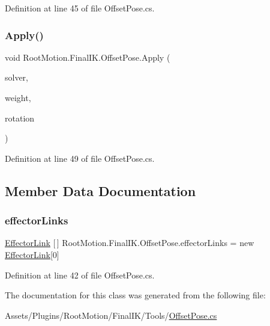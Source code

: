 Definition at line 45 of file Offset\+Pose.\+cs.

\mbox{\label{class_root_motion_1_1_final_i_k_1_1_offset_pose_a07d594579efa5d24c035c9b7f7466c4a}} 
\subsubsection{\texorpdfstring{Apply()}{Apply()}\hspace{0.1cm}{\footnotesize\ttfamily [2/2]}}
{\footnotesize\ttfamily void Root\+Motion.\+Final\+I\+K.\+Offset\+Pose.\+Apply (\begin{DoxyParamCaption}\item[{\mbox{\hyperlink{class_root_motion_1_1_final_i_k_1_1_i_k_solver_full_body_biped}{I\+K\+Solver\+Full\+Body\+Biped}}}]{solver,  }\item[{float}]{weight,  }\item[{Quaternion}]{rotation }\end{DoxyParamCaption})}



Definition at line 49 of file Offset\+Pose.\+cs.



\subsection{Member Data Documentation}
\mbox{\label{class_root_motion_1_1_final_i_k_1_1_offset_pose_a5cf6d676790ad541fda32fec19ce4e40}} 
\subsubsection{\texorpdfstring{effector\+Links}{effectorLinks}}
{\footnotesize\ttfamily \mbox{\hyperlink{class_root_motion_1_1_final_i_k_1_1_offset_pose_1_1_effector_link}{Effector\+Link}} \mbox{[}$\,$\mbox{]} Root\+Motion.\+Final\+I\+K.\+Offset\+Pose.\+effector\+Links = new \mbox{\hyperlink{class_root_motion_1_1_final_i_k_1_1_offset_pose_1_1_effector_link}{Effector\+Link}}\mbox{[}0\mbox{]}}



Definition at line 42 of file Offset\+Pose.\+cs.



The documentation for this class was generated from the following file\+:\begin{DoxyCompactItemize}
\item 
Assets/\+Plugins/\+Root\+Motion/\+Final\+I\+K/\+Tools/\mbox{\hyperlink{_offset_pose_8cs}{Offset\+Pose.\+cs}}\end{DoxyCompactItemize}
